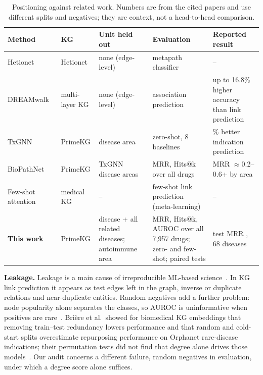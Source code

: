 \documentclass{ieeeaccess}
\begin{document}
\begin{table}[!t]
\centering
\caption{Positioning against related work. Numbers are from the cited papers and use different splits and negatives; they are context, not a head-to-head comparison.}
\label{tab:related}
\small
\renewcommand{\arraystretch}{1.12}
\begin{tabular}{>{\raggedright\arraybackslash}p{2.3cm}>{\raggedright\arraybackslash}p{2.0cm}>{\raggedright\arraybackslash}p{3.6cm}>{\raggedright\arraybackslash}p{3.6cm}>{\raggedright\arraybackslash}p{4.1cm}}
\toprule
Method & KG & Unit held out & Evaluation & Reported result \\
\midrule
Hetionet~\cite{himmelstein2017hetionet} & Hetionet & none (edge-level) & metapath classifier & -- \\
DREAMwalk~\cite{bang2023dreamwalk} & multi-layer KG & none (edge-level) & association prediction & up to 16.8\% higher accuracy than link prediction \\
TxGNN~\cite{huang2024txgnn} & PrimeKG & disease area & zero-shot, 8 baselines & 49.2\% better indication prediction \\
BioPathNet~\cite{hu2026biopathnet} & PrimeKG & TxGNN disease areas & MRR, Hits@k over all drugs & MRR $\approx$0.2--0.6+ by area \\
Few-shot attention~\cite{yang2024fewshot} & medical KG & -- & few-shot link prediction (meta-learning) & -- \\
\textbf{This work} & PrimeKG & disease + all related diseases; autoimmune area & MRR, Hits@k, AUROC over all 7,957 drugs; zero- and few-shot; paired tests & test MRR \TestMrr{}, 68 diseases \\
\bottomrule
\end{tabular}
\end{table}

\textbf{Leakage.} Leakage is a main cause of irreproducible ML-based science~\cite{kapoor2023leakage}. In KG link prediction it appears as test edges left in the graph, inverse or duplicate relations and near-duplicate entities. Random negatives add a further problem: node popularity alone separates the classes, so AUROC is uninformative when positives are rare~\cite{saito2015prc,davis2006prroc}. Bri\`ere et al.\ showed for biomedical KG embeddings that removing train--test redundancy lowers performance and that random and cold-start splits overestimate repurposing performance on Orphanet rare-disease indications; their permutation tests did not find that degree alone drives those models~\cite{briere2026leakage}. Our audit concerns a different failure, random negatives in evaluation, under which a degree score alone suffices.
\end{document}
